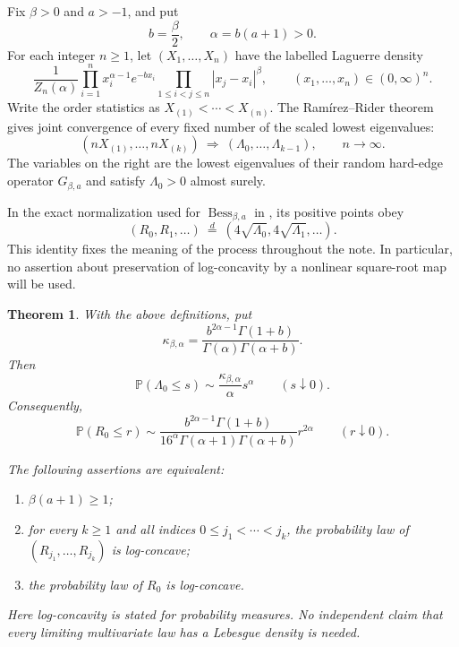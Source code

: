 \documentclass[11pt,a4paper]{article}
\newtheorem{theorem}{Theorem}[section]
\theoremstyle{definition}
\theoremstyle{remark}
\newcommand{\PP}{\mathbb P}
\newcommand{\Bess}{\operatorname{Bess}}
\begin{document}
Fix $\beta>0$ and $a>-1$, and put
\[
 b=\frac\beta2,\qquad \alpha=b(a+1)>0.
\]
For each integer $n\geq1$, let $(X_1,\ldots,X_n)$ have the labelled
Laguerre density
\begin{equation}\label{he:eq:Laguerre}
 \frac1{Z_n(\alpha)}
 \prod_{i=1}^n x_i^{\alpha-1}e^{-b x_i}
 \prod_{1\leq i<j\leq n}|x_j-x_i|^\beta,
 \qquad (x_1,\ldots,x_n)\in(0,\infty)^n.
\end{equation}
Write the order statistics as $X_{(1)}<\cdots<X_{(n)}$.
The Ram\'irez--Rider theorem \cite[Theorem~1]{heRR} gives joint
convergence of every fixed number of the scaled lowest eigenvalues:
\begin{equation}\label{he:eq:RRlimit}
 (nX_{(1)},\ldots,nX_{(k)})
 \ \Longrightarrow\ (\Lambda_0,\ldots,\Lambda_{k-1}),
 \qquad n\longrightarrow\infty.
\end{equation}
The variables on the right are the lowest eigenvalues of their random
hard-edge operator $G_{\beta,a}$ and satisfy $\Lambda_0>0$ almost surely.

In the exact normalization used for $\Bess_{\beta,a}$ in
\cite[Proposition~12]{heLV}, its positive points obey
\begin{equation}\label{he:eq:normalization}
 (R_0,R_1,\ldots)\ \stackrel{d}=\
 (4\sqrt{\Lambda_0},4\sqrt{\Lambda_1},\ldots).
\end{equation}
This identity fixes the meaning of the process throughout the note.
In particular, no assertion about preservation of log-concavity by a
nonlinear square-root map will be used.

\begin{theorem}\label{he:thm:main}
With the above definitions, put
\[
 \kappa_{\beta,\alpha}
 =\frac{b^{2\alpha-1}\Gamma(1+b)}
 {\Gamma(\alpha)\Gamma(\alpha+b)}.
\]
Then
\begin{equation}\label{he:eq:smallLambda}
 \PP(\Lambda_0\leq s)
 \sim \frac{\kappa_{\beta,\alpha}}{\alpha}s^\alpha
 \qquad(s\downarrow0).
\end{equation}
Consequently,
\begin{equation}\label{he:eq:smallR}
 \PP(R_0\leq r)
 \sim
 \frac{b^{2\alpha-1}\Gamma(1+b)}
 {16^\alpha\Gamma(\alpha+1)\Gamma(\alpha+b)}r^{2\alpha}
 \qquad(r\downarrow0).
\end{equation}
\par\begin{samepage}
\noindent The following assertions are equivalent:
\begin{enumerate}
 \item $\beta(a+1)\geq1$;
 \item for every $k\geq1$ and all indices
 $0\leq j_1<\cdots<j_k$, the probability law of
 $(R_{j_1},\ldots,R_{j_k})$ is log-concave;
 \item the probability law of $R_0$ is log-concave.
\end{enumerate}
\end{samepage}
Here log-concavity is stated for probability measures.  No independent
claim that every limiting multivariate law has a Lebesgue density is
needed.
\end{theorem}
\end{document}
